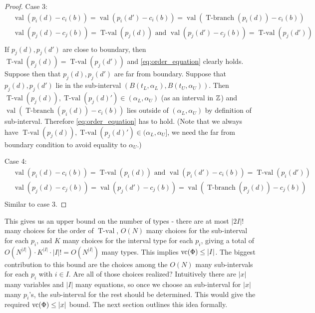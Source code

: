 \documentclass{amsart}
\newcommand{\paren}[1]{\left(#1\right)}
\DeclareMathOperator{\vval}{val}
\DeclareMathOperator{\tval}{T-val}
\DeclareMathOperator{\tbr}{T-branch}
\begin{document}
\begin{proof}
  Case 3:
  \begin{align*}
    &\vval (p_i(d) - c_i(b)) = \vval (p_i(d') - c_i(b)) = \vval(\tbr(p_i(d)) - c_i(b)) \\
    &\vval (p_j(d) - c_j(b)) = \tval(p_j(d)) \text{ and } \vval (p_j(d') - c_j(b)) = \tval(p_j(d')) \\
  \end{align*}
  If $p_j(d), p_j(d')$ are close to boundary,
  then $\tval(p_j(d)) = \tval(p_j(d'))$ and \eqref{eq:order_equation} clearly holds.
  Suppose then that $p_j(d), p_j(d')$ are far from boundary.
  Suppose that $p_j(d), p_j(d')$ lie in the sub-interval $\paren{B(t_L, \alpha_L),  B(t_U, \alpha_U)}$.
  Then $\tval(p_j(d)), \tval(p_j(d)') \in (\alpha_L, \alpha_U)$ (as an interval in $\mathbb{Z}$)
  and $\vval(\tbr(p_i(d)) - c_i(b))$ lies outside of $(\alpha_L, \alpha_U)$ by definition of sub-interval.
  Therefore \eqref{eq:order_equation} has to hold.
  (Note that we always have $\tval(p_j(d)), \tval(p_j(d)') \in (\alpha_L, \alpha_U]$,
  we need the far from boundary condition to avoid equality to $\alpha_U$.)

  Case 4:
  \begin{align*}
    &\vval (p_i(d) - c_i(b)) = \tval(p_i(d)) \text{ and } \vval (p_i(d') - c_i(b)) = \tval(p_i(d')) \\
    &\vval (p_j(d) - c_j(b)) = \vval (p_j(d') - c_j(b)) = \vval(\tbr(p_j(d)) - c_j(b)) \\
  \end{align*}
  Similar to case 3.
\end{proof}



\begin{Note}
  This gives us an upper bound on the number of types - there are at most $|2I|!$ many choices for the order of $\tval$,
  $O(N)$ many choices for the sub-interval for each $p_i$,
  and $K$ many choices for the interval type for each $p_i$,
  giving a total of $O(N^{|I|}) \cdot K^{|I|} \cdot |I|! = O(N^{|I|})$ many types.
  This implies $\operatorname{vc}(\Phi) \leq |I|$.
  The biggest contribution to this bound are the choices among the $O(N)$ many sub-intervals for each $p_i$ with $i \in I$.
  Are all of those choices realized?
  Intuitively there are $|x|$ many variables and $|I|$ many equations,
  so once we choose an sub-interval for $|x|$ many $p_i$'s, the sub-interval for the rest should be determined.
  This would give the required $\operatorname{vc}(\Phi) \leq |x|$ bound.
  The next section outlines this idea formally.
\end{Note}
\end{document}
